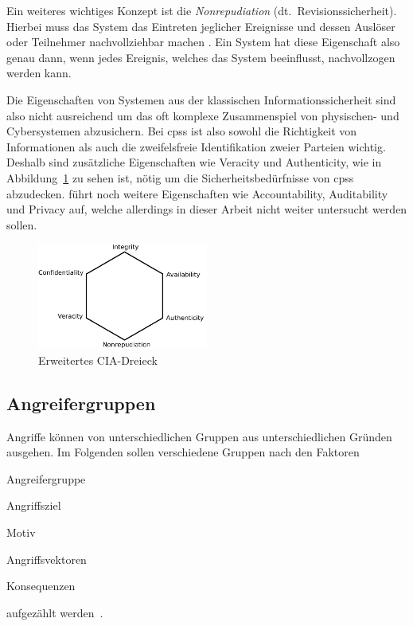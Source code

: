\documentclass[final,bibliography=totocnumbered]{include/sikseminar}
\newcommand{\cps}{\glspl{cps}\xspace}
\begin{document}
Ein weiteres wichtiges Konzept ist die \textit{Nonrepudiation} (dt.\ Revisionssicherheit).
Hierbei muss das System das Eintreten jeglicher Ereignisse und dessen Auslöser oder Teilnehmer nachvollziehbar machen \cite{CH13}.
Ein System hat diese Eigenschaft also genau dann, wenn jedes Ereignis, welches das System beeinflusst, nachvollzogen werden kann. \label{def:nonrepudiation}

Die Eigenschaften von Systemen aus der klassischen Informationssicherheit sind also nicht ausreichend um das oft komplexe Zusammenspiel von physischen- und Cybersystemen abzusichern.
Bei \cps ist also sowohl die Richtigkeit von Informationen als auch die zweifelsfreie Identifikation zweier Parteien wichtig.
Deshalb sind zusätzliche Eigenschaften wie Veracity und Authenticity, wie in Abbildung~\ref{fig:triad} zu sehen ist, nötig um die Sicherheitsbedürfnisse von \cps abzudecken.
\citeauthor{CH13} führt noch weitere Eigenschaften wie Accountability, Auditability und Privacy auf, welche allerdings in dieser Arbeit nicht weiter untersucht werden sollen.

\begin{figure}
    \centering
    \includegraphics[width=0.5\textwidth]{triad}
    \caption{Erweitertes CIA-Dreieck}
    \label{fig:triad}
\end{figure}



\subsection{Angreifergruppen}\label{subsec:angreifergruppen}

Angriffe können von unterschiedlichen Gruppen aus unterschiedlichen Gründen ausgehen.
Im Folgenden sollen verschiedene Gruppen nach den Faktoren
\begin{enumerate*}[label=(\alph*),before=\unskip{: }, itemjoin={{; }}, itemjoin*={{, und }}]
    \item Angreifergruppe\label{factor:angreifergruppe}
    \item Angriffsziel\label{factor:target}
    \item Motiv\label{factor:motiv}
    \item Angriffsvektoren\label{factor:methode}
    \item Konsequenzen\label{factor:konsequenz}
\end{enumerate*} aufgezählt werden~\cite{HLL+17}.
\end{document}
